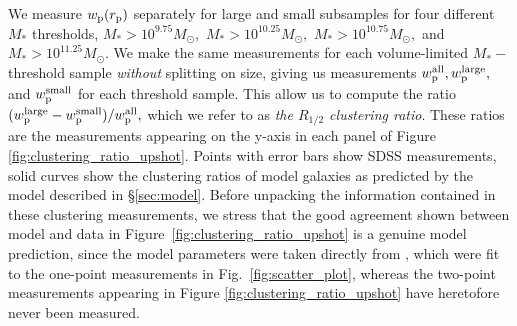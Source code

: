\documentclass[usenatbib,usegraphicx,letterpaper]{mn2e}
\newcommand{\rhalf}{R_{1/2}}
\newcommand{\mstar}{M_{\ast}}
\newcommand{\rproj}{r_{\rm p}}
\newcommand{\wproj}{w_{\rm p}}
\newcommand{\wplarge}{w_{\rm p}^{\rm large}}
\newcommand{\wpsmall}{w_{\rm p}^{\rm small}}
\newcommand{\wpall}{w_{\rm p}^{\rm all}}
\newcommand{\msun}{M_\odot}
\begin{document}
We measure $\wproj(\rproj)$ separately for large and small subsamples for four different $\mstar$ thresholds, $\mstar>10^{9.75}\msun,$ $\mstar>10^{10.25}\msun,$ $\mstar>10^{10.75}\msun,$ and $\mstar>10^{11.25}\msun.$ We make the same measurements for each volume-limited $\mstar-$threshold sample {\em without} splitting on size, giving us measurements $\wpall, \wplarge,$ and $\wpsmall$ for each threshold sample. This allow us to compute the ratio $(\wplarge-\wpsmall)/\wpall,$ which we refer to as {\em the $\rhalf$ clustering ratio}. These ratios are the measurements appearing on the y-axis in each panel of Figure \ref{fig:clustering_ratio_upshot}. Points with error bars show SDSS measurements, solid curves show the clustering ratios of model galaxies as predicted by the model described in \S\ref{sec:model}. Before unpacking the information contained in these clustering measurements, we stress that the good agreement shown between model and data in Figure~\ref{fig:clustering_ratio_upshot} is a genuine model prediction, since the model parameters were taken directly from \citet{kravtsov13}, which were fit to the one-point measurements in Fig.~\ref{fig:scatter_plot}, whereas the two-point measurements appearing in Figure \ref{fig:clustering_ratio_upshot} have heretofore never been measured. 
\end{document}
